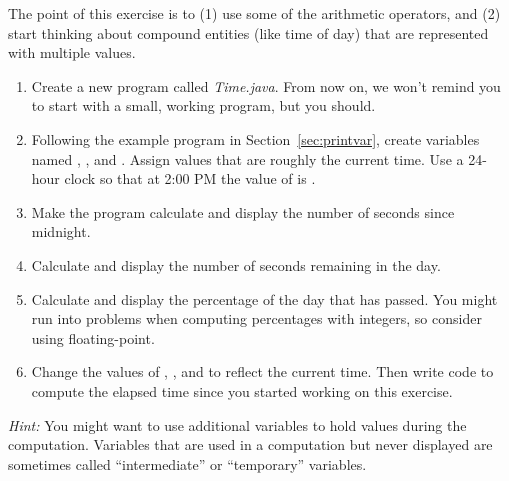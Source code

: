\begin{exercise}  %

The point of this exercise is to (1) use some of the arithmetic operators, and (2) start thinking about compound entities (like time of day) that are represented with multiple values.

\begin{enumerate}

\item Create a new program called {\it Time.java}.
From now on, we won't remind you to start with a small, working program, but you should.

\item Following the example program in Section~\ref{sec:printvar}, create variables named , , and .
Assign values that are roughly the current time.
Use a 24-hour clock so that at 2:00 PM the value of  is .

\item Make the program calculate and display the number of seconds since midnight.

\item Calculate and display the number of seconds remaining in the day.

\item Calculate and display the percentage of the day that has passed.
You might run into problems when computing percentages with integers, so consider using floating-point.

\item Change the values of , , and  to reflect the current time.
Then write code to compute the elapsed time since you started working on this exercise.

\end{enumerate}

{\em Hint:} You might want to use additional variables to hold values during the computation.
Variables that are used in a computation but never displayed are sometimes called ``intermediate'' or ``temporary'' variables.

\end{exercise}
